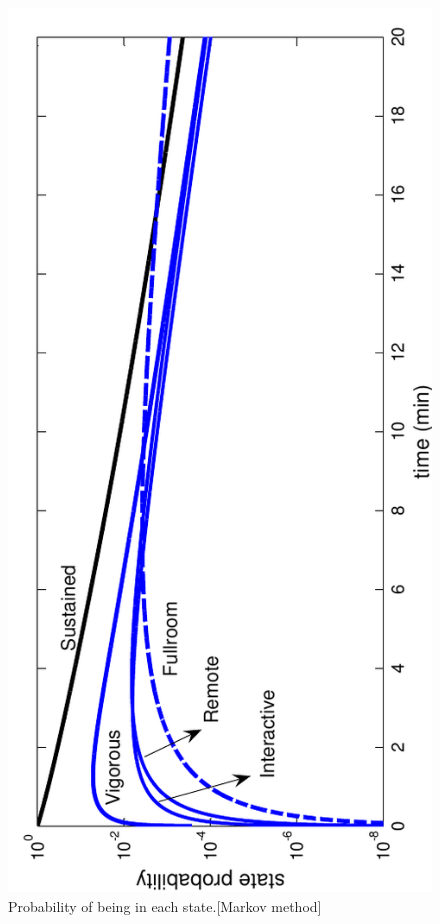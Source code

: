 \documentclass[12pt]{asme2ej}
\begin{document}
\begin{figure}[h!] \centering
  \includegraphics[scale=0.8, angle=-90]{FireStateProbsMarkov}
  \caption{Probability of being in each state.[Markov method]\label{fig:FireStateProbsMarkov}} 
\end{figure}
\end{document}
